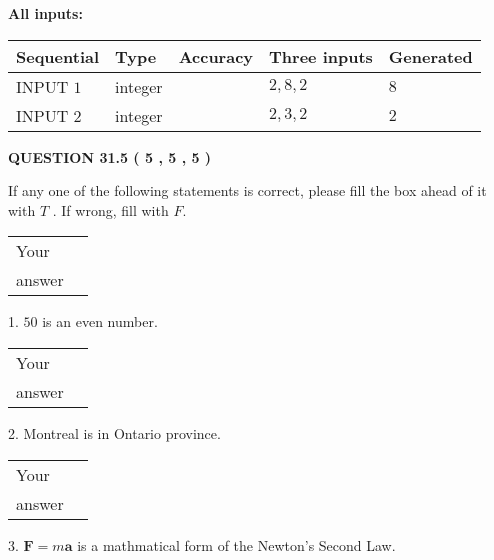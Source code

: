 \documentclass[12pt]{article}
\begin{document}
   
   
   
\noindent\vspace{0.1in}\hspace{-0.08in} {\textbf{\Large{All inputs: }}}
   
   
  
  
\noindent\begin{tabular}{|l|l|l|l|l|}
\hline
 Sequential & Type & Accuracy & Three inputs & Generated \\ 
\hline
 
 
  INPUT $            1 $ & integer &  & $
 2
 , 
 8
 , 
 2
 $ & $ 8 $ 
 \\  \hline  
 
 
  INPUT $            2 $ & integer &  & $
 2
 , 
 3
 , 
 2
 $ & $ 2 $ 
 \\  \hline  
 \end{tabular}
   
   
  
\vspace{0.2in}
  
{\textbf{\Large{QUESTION
31.5 
 (           5 ,           5 ,           5 )
}}}
  
  
If any one of the following statements is correct, please fill the box ahead of it with $T$ .
If wrong, fill with $F$.
 
\noindent\begin{tabular}{|l|l|}\hline Your&\hspace{.2in} \\ answer&\hspace{.2in} \\ \hline \end{tabular}
1. $ %
50$ is an  %
even number.
 
\noindent\begin{tabular}{|l|l|}\hline Your&\hspace{.2in} \\ answer&\hspace{.2in} \\ \hline \end{tabular}
2.  %
Montreal is in  %
Ontario province.
 
\noindent\begin{tabular}{|l|l|}\hline Your&\hspace{.2in} \\ answer&\hspace{.2in} \\ \hline \end{tabular}
3.  %
$\mathbf{F}=m\mathbf{a}$ is a mathmatical form of
the Newton's Second Law.
 
\end{document}

